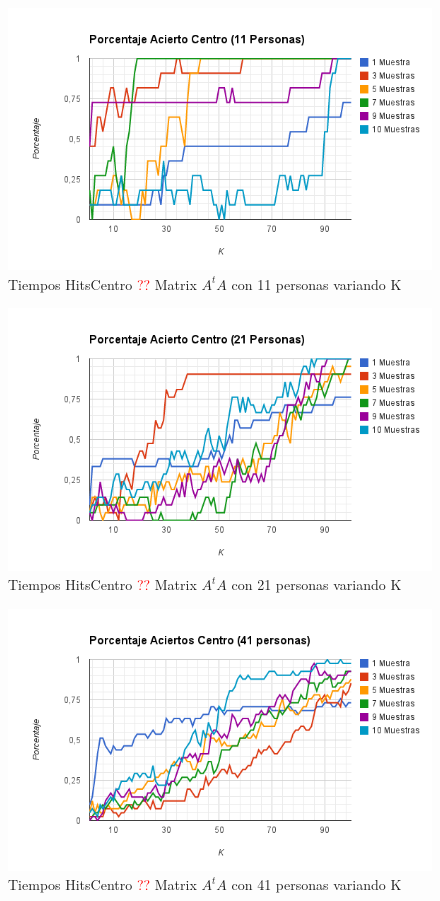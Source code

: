 \begin{figure}[H]
\includegraphics[width=1\textwidth]{img/imagem.png}
     \caption{Tiempos HitsCentro \textcolor{red}{??} Matrix $A^tA$ con 11 personas variando K}
     \label{fig:figura1}
\end{figure}

\begin{figure}[H]
\includegraphics[width=1\textwidth]{img/imagen.png}
     \caption{Tiempos HitsCentro \textcolor{red}{??} Matrix $A^tA$ con 21 personas variando K}
     \label{fig:figura1}
\end{figure}

\begin{figure}[H]
\includegraphics[width=1\textwidth]{img/imager.png}
     \caption{Tiempos HitsCentro \textcolor{red}{??} Matrix $A^tA$ con 41 personas variando K}
     \label{fig:figura1}
\end{figure}

